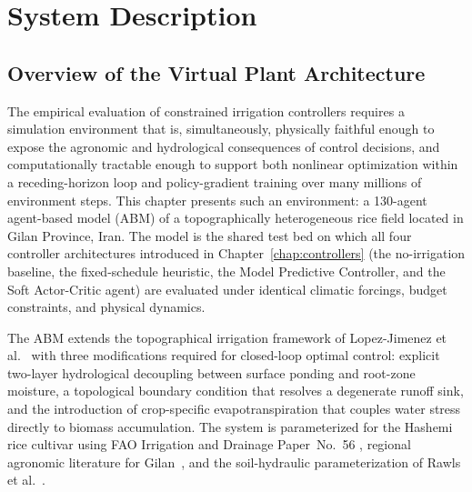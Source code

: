 
\chapter{System Description}
\label{chap:system}

\section{Overview of the Virtual Plant Architecture}
\label{sec:sys-overview}

The empirical evaluation of constrained irrigation controllers requires a
simulation environment that is, simultaneously, physically faithful enough
to expose the agronomic and hydrological consequences of control decisions,
and computationally tractable enough to support both nonlinear optimization
within a receding-horizon loop and policy-gradient training over many
millions of environment steps. This chapter presents such an environment:
a 130-agent agent-based model (ABM) of a topographically heterogeneous
rice field located in Gilan Province, Iran. The model is the shared
test bed on which all four controller architectures introduced in
Chapter~\ref{chap:controllers} (the no-irrigation baseline, the
fixed-schedule heuristic, the Model Predictive Controller, and the
Soft Actor-Critic agent) are evaluated under identical climatic forcings,
budget constraints, and physical dynamics.

The ABM extends the topographical irrigation framework of Lopez-Jimenez
et al.~\cite{Lopezjimenez2024,LopezJimenez2022} with three modifications
required for closed-loop optimal control: explicit two-layer hydrological
decoupling between surface ponding and root-zone moisture, a topological
boundary condition that resolves a degenerate runoff sink, and the
introduction of crop-specific evapotranspiration that couples water stress
directly to biomass accumulation. The system is parameterized for the
Hashemi rice cultivar using FAO Irrigation and Drainage Paper~No.~56
\cite{allen1998}, regional agronomic literature for
Gilan~\cite{jalali2021,sadidi2021}, and the soil-hydraulic
parameterization of Rawls et al.~\cite{rawls1982}.

